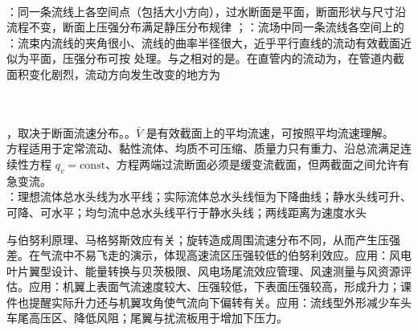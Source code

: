 \\

：同一条流线上各空间点（包括大小方向），过水断面是平面，断面形状与尺寸沿流程不变，断面上压强分布满足静压分布规律 ；：流场中同一条流线各空间上的\\
：流束内流线的夹角很小、流线的曲率半径很大，近乎平行直线的流动有效截面近似为平面，压强分布可按  处理。与之相对的是。在直管内的流动为，在管道内截面积变化剧烈，流动方向发生改变的地方为

\\
\\
，取决于断面流速分布。。$\bar V$ 是有效截面上的平均流速，可按照平均流速理解。\\
方程适用于定常流动、黏性流体、均质不可压缩、质量力只有重力、沿总流满足连续性方程 $q_v=\mathrm{const}$、方程两端过流断面必须是缓变流截面，但两截面之间允许有急变流。\\
：理想流体总水头线为水平线；实际流体总水头线恒为下降曲线；静水头线可升、可降、可水平；均匀流中总水头线平行于静水头线；两线距离为速度水头

\divider


与伯努利原理、马格努斯效应有关；旋转造成周围流速分布不同，从而产生压强差。在气流中不易飞走的演示，体现高速流区压强较低的伯努利效应。应用：风电叶片翼型设计、能量转换与贝茨极限、风电场尾流效应管理、风速测量与风资源评估。应用：机翼上表面气流速度较大、压强较低，下表面压强较高，形成升力；课件也提醒实际升力还与机翼攻角使气流向下偏转有关。应用：流线型外形减少车头车尾高压区、降低风阻；尾翼与扰流板用于增加下压力。

\divider

